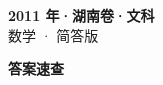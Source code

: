 \documentclass[zihao=-4, a4paper]{ctexart}
\begin{document}
\begin{center}
  {\Large\bfseries 2011 年·湖南卷·文科}\\[4pt]
  {\large 数学 · 简答版}
\end{center}
\medskip
{}

\clearpage
{}
\begin{center}{\Large\bfseries 答案速查}\end{center}
\medskip

\end{document}
